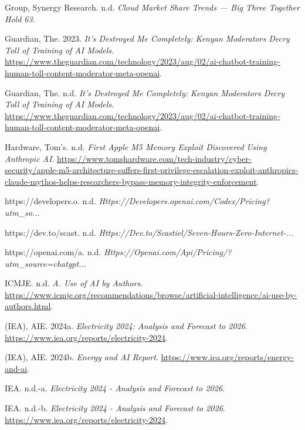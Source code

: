 \documentclass[
  10pt,
  a4paper,
  DIV=11,
  numbers=noendperiod,
  oneside]{scrreprt}
\newlength{\cslhangindent}
\newenvironment{CSLReferences}[2] %
 {\begin{list}{}{%
  \setlength{\itemindent}{0pt}
  \setlength{\leftmargin}{0pt}
  \setlength{\parsep}{0pt}
  \ifodd #1
   \setlength{\leftmargin}{\cslhangindent}
   \setlength{\itemindent}{-1\cslhangindent}
  \fi
  \setlength{\itemsep}{#2\baselineskip}}}
 {\end{list}}
\let\oldemph\emph
\renewcommand{\emph}[1]{\oldemph{\textcolor{cmmgray}{#1}}}
\begin{document}
\begin{CSLReferences}{1}{1}
Group, Synergy Research. n.d. \emph{Cloud Market Share Trends --- Big
Three Together Hold 63}.

Guardian, The. 2023. \emph{It's Destroyed Me Completely: Kenyan
Moderators Decry Toll of Training of AI Models}.
\url{https://www.theguardian.com/technology/2023/aug/02/ai-chatbot-training-human-toll-content-moderator-meta-openai}.

Guardian, The. n.d. \emph{It's Destroyed Me Completely: Kenyan
Moderators Decry Toll of Training of AI Models}.
\url{https://www.theguardian.com/technology/2023/aug/02/ai-chatbot-training-human-toll-content-moderator-meta-openai}.

Hardware, Tom's. n.d. \emph{First Apple M5 Memory Exploit Discovered
Using Anthropic AI}.
\url{https://www.tomshardware.com/tech-industry/cyber-security/apple-m5-architecture-suffers-first-privilege-escalation-exploit-anthropics-claude-mythos-helps-researchers-bypass-memory-integrity-enforcement}.

{https://developers.o}. n.d.
\emph{Https://Developers.openai.com/Codex/Pricing?utm\_so...}

{https://dev.to/scast}. n.d.
\emph{Https://Dev.to/Scastiel/Seven-Hours-Zero-Internet-...}

{https://openai.com/a}. n.d.
\emph{Https://Openai.com/Api/Pricing/?utm\_source=chatgpt...}

ICMJE. n.d. \emph{A. Use of AI by Authors}.
\url{https://www.icmje.org/recommendations/browse/artificial-intelligence/ai-use-by-authors.html}.

(IEA), AIE. 2024a. \emph{Electricity 2024: Analysis and Forecast to
2026}. \url{https://www.iea.org/reports/electricity-2024}.

(IEA), AIE. 2024b. \emph{Energy and AI Report}.
\url{https://www.iea.org/reports/energy-and-ai}.

IEA. n.d.-a. \emph{Electricity 2024 - Analysis and Forecast to 2026}.

IEA. n.d.-b. \emph{Electricity 2024 - Analysis and Forecast to 2026}.
\url{https://www.iea.org/reports/electricity-2024}.


\end{CSLReferences}
\end{document}
